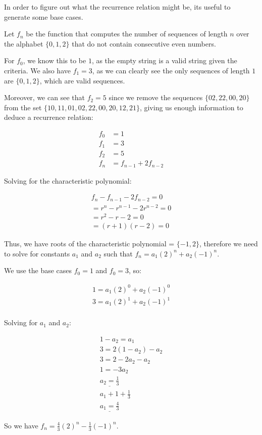 \documentclass[10pt]{article}
\begin{document}
In order to figure out what the recurrence relation might be, its useful to generate
some base cases.
\spacing

\noindent
Let $f_{n}$ be the function that computes the number of sequences of length $n$ over the alphabet
$\{0, 1, 2\}$ that do not contain consecutive even numbers.
\spacing

\noindent
For $f_{0}$, we know this to be $1$, as the empty string is a valid string given the criteria. We also have
$f_{1} = 3$, as we can clearly see the only sequences of length $1$ are $\{0, 1, 2\}$, which are valid sequences.
\spacing

\noindent
Moreover, we can see that $f_{2} = 5$ since we remove the sequences $\{02, 22, 00, 20\}$ 
from the set $\{10, 11, 01, 02, 22, 00, 20, 12, 21\}$, giving us enough information to deduce
a recurrence relation:

\begin{align*}
  f_{0} &= 1 \\
  f_{1} &= 3 \\
  f_{2} &= 5 \\
  f_{n} &= f_{n - 1} + 2f_{n - 2}
\end{align*}

\noindent
Solving for the characteristic polynomial:

\begin{align*}
  f_{n} - f_{n - 1} - 2f_{n - 2} = 0 \\
  = r^{n} - r^{n - 1} - 2r^{n - 2} = 0 \\
  = r^2 - r - 2 = 0 \\
  = (r + 1)(r - 2) = 0
\end{align*}

\noindent
Thus, we have roots of the characteristic polynomial = $\{-1, 2\}$, therefore we need to solve
for constants $a_{1}$ and $a_{2}$ such that $f_{n} = a_{1}(2)^n + a_{2}(-1)^n$.
\spacing

\noindent
We use the base cases $f_{0} = 1$ and $f_{0} = 3$, so:

\begin{align*}
  1 = a_{1}(2)^0 + a_{2}(-1)^0 \\
  3 = a_{1}(2)^1 + a_{2}(-1)^1 \\
\end{align*}

\noindent
Solving for $a_{1}$ and $a_{2}$:

\begin{align*}
  1 - a_{2} = a_{1} \\
  3 = 2(1 - a_{2}) - a_{2} \\
  3 = 2 - 2a_{2} - a_{2} \\
  1 = -3a_{2} \\
  \underline{a_{2} = \frac{1}{3}} \\
  a_{1} + 1 + \frac{1}{3} \\
  \underline{a_{1} = \frac{4}{3}}
\end{align*}

\noindent
So we have $f_{n} = \frac{4}{3}(2)^n - \frac{1}{3}(-1)^n$.
\end{document}
